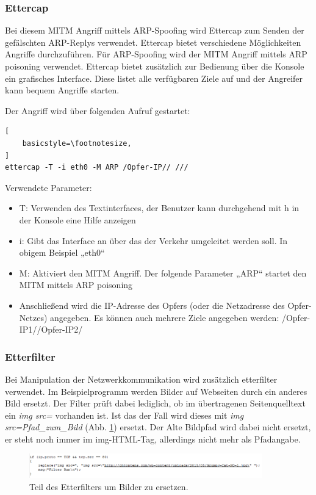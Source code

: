 \subsubsection*{Ettercap}

Bei diesem MITM Angriff mittels ARP-Spoofing wird Ettercap zum Senden der gefälschten ARP-Replys verwendet. Ettercap bietet verschiedene Möglichkeiten Angriffe durchzuführen. Für ARP-Spoofing wird der MITM Angriff mittels ARP poisoning verwendet.
Ettercap bietet zusätzlich zur Bedienung über die Konsole ein grafisches Interface. Diese listet alle verfügbaren Ziele auf und der Angreifer kann bequem Angriffe starten.

Der Angriff wird über folgenden Aufruf gestartet:
\lstset{language=bash}
\begin{lstlisting}[
	basicstyle=\footnotesize,
]
ettercap -T -i eth0 -M ARP /Opfer-IP// ///
\end{lstlisting}

Verwendete Parameter:
\begin{itemize}
	\item T: Verwenden des Textinterfaces, der Benutzer kann durchgehend mit h in der Konsole eine Hilfe anzeigen
	\item i: Gibt das Interface an über das der Verkehr umgeleitet werden soll. In obigem Beispiel „eth0“
	\item M: Aktiviert den MITM Angriff. Der folgende Parameter „ARP“ startet den MITM mittels ARP poisoning
	\item Anschließend wird die IP-Adresse des Opfers (oder die Netzadresse des Opfer-Netzes) angegeben. Es können auch mehrere Ziele angegeben werden: /Opfer-IP1//Opfer-IP2/ 
\end{itemize}

\subsubsection*{Etterfilter}
Bei Manipulation der Netzwerkkommunikation wird zusätzlich etterfilter verwendet. Im Beispielprogramm werden Bilder auf Webseiten durch ein anderes Bild ersetzt. Der Filter prüft dabei lediglich, ob im übertragenen Seitenquelltext ein \textit{img src=} vorhanden ist. Ist das der Fall wird dieses mit \textit{img src=Pfad\_zum\_Bild} (Abb. \ref{fig:etterfilter}) ersetzt. Der Alte Bildpfad wird dabei nicht ersetzt, er steht noch immer im img-HTML-Tag, allerdings nicht mehr als Pfadangabe.
\begin{figure}[h!]
	\centering
		\includegraphics[width=0.90\textwidth]{bilder/arpSpoofing/etterfilter.pdf}
	\caption{Teil des Etterfilters um Bilder zu ersetzen.}
	\label{fig:etterfilter}
\end{figure}


